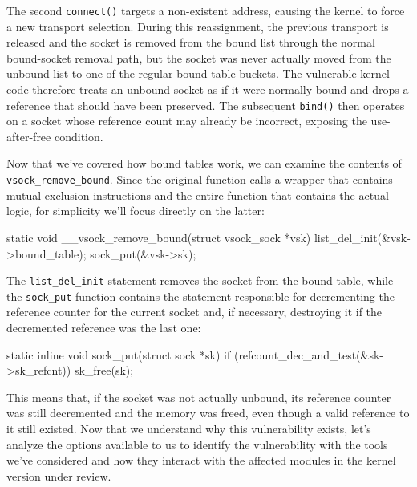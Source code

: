 The second \texttt{connect()} targets a non-existent address, causing the kernel to force a new transport selection. During this reassignment, the previous transport is released and the socket is removed from the bound list through the normal bound-socket removal path, but the socket was never actually moved from the unbound list to one of the regular bound-table buckets. The vulnerable kernel code therefore treats an unbound socket as if it were normally bound and drops a reference that should have been preserved. The subsequent \texttt{bind()} then operates on a socket whose reference count may already be incorrect, exposing the use-after-free condition.

Now that we've covered how bound tables work, we can examine the contents of \texttt{vsock\_remove\_bound}. Since the original function calls a wrapper that contains mutual exclusion instructions and the entire function that contains the actual logic, for simplicity we'll focus directly on the latter:

\begin{clncode}
    static void __vsock_remove_bound(struct vsock_sock *vsk)
    {
    	list_del_init(&vsk->bound_table);
    	sock_put(&vsk->sk);
    }
\end{clncode}

\noindent The \texttt{list\_del\_init} statement removes the socket from the bound table, while the \texttt{sock\_put} function contains the statement responsible for decrementing the reference counter for the current socket and, if necessary, destroying it if the decremented reference was the last one:

\begin{clncode}
    static inline void sock_put(struct sock *sk)
    {
    	if (refcount_dec_and_test(&sk->sk_refcnt))
    		sk_free(sk);
    }
\end{clncode}

\noindent This means that, if the socket was not actually unbound, its reference counter was still decremented and the memory was freed, even though a valid reference to it still existed. Now that we understand why this vulnerability exists, let's analyze the options available to us to identify the vulnerability with the tools we've considered and how they interact with the affected modules in the kernel version under review.

\begin{listing}[t]
    \label{lst:cve_test_case}
\end{listing}
\begin{listing}[t]
\end{listing}